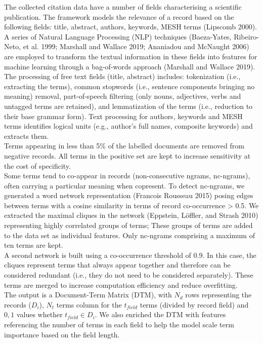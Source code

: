 \documentclass{article}
\begin{document}
The collected citation data have a number of fields characterising a
scientific publication. The framework models the relevance of a record
based on the following fields: title, abstract, authors, keywords, MESH
terms (Lipscomb 2000). A series of Natural Language Processing (NLP)
techniques (Baeza-Yates, Ribeiro-Neto, et al. 1999; Marshall and Wallace
2019; Ananiadou and McNaught 2006) are employed to transform the textual
information in these fields into features for machine learning through a
bag-of-words approach (Marshall and Wallace 2019). The processing of
free text fields (title, abstract) includes: tokenization (i.e.,
extracting the terms), common stopwords (i.e., sentence components
bringing no meaning) removal, part-of-speech filtering (only nouns,
adjectives, verbs and untagged terms are retained), and lemmatization of
the terms (i.e., reduction to their base grammar form). Text processing
for authors, keywords and MESH terms identifies logical units (e.g.,
author's full names, composite keywords) and extracts them.\\
Terms appearing in less than 5\% of the labelled documents are removed
from negative records. All terms in the positive set are kept to
increase sensitivity at the cost of specificity.\\
Some terms tend to co-appear in records (non-consecutive ngrams,
nc-ngrams), often carrying a particular meaning when copresent. To
detect nc-ngrams, we generated a word network representation (Francois
Rousseau 2015) posing edges between terms with a cosine similarity in
terms of record co-occurrence \textgreater{} 0.5. We extracted the
maximal cliques in the network (Eppstein, Löffler, and Strash 2010)
representing highly correlated groups of terms; These groups of terms
are added to the data set as individual features. Only nc-ngrams
comprising a maximum of ten terms are kept.\\
A second network is built using a co-occurrence threshold of 0.9. In
this case, the cliques represent terms that always appear together and
therefore can be considered redundant (i.e., they do not need to be
considered separately). These terms are merged to increase computation
efficiency and reduce overfitting.\\
The output is a Document-Term Matrix (DTM), with \(N_d\) rows
representing the records (\(D_i\)), \(N_t\) terms column for the
\(t_{field}\) terms (divided by record field) and \({0,1}\) values
whether \(t_{field} \in D_i\). We also enriched the DTM with features
referencing the number of terms in each field to help the model scale
term importance based on the field length.
\end{document}
